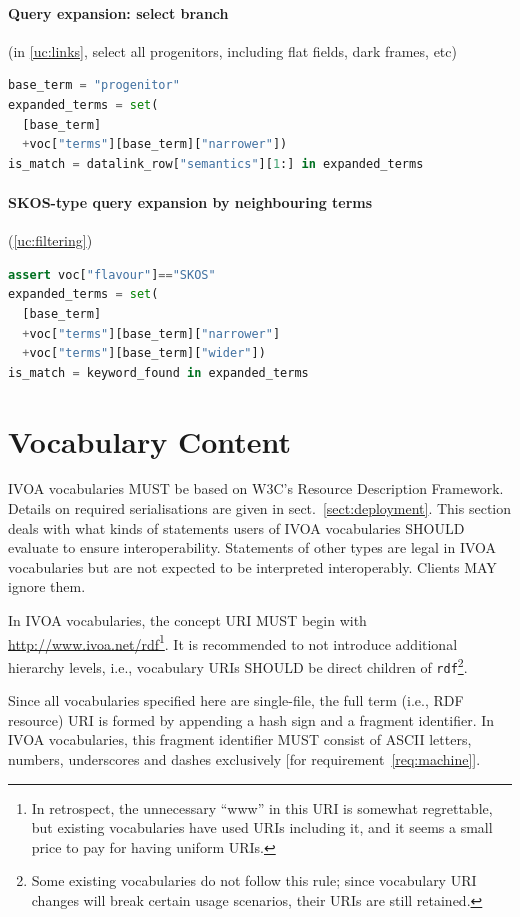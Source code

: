 \documentclass[11pt,a4paper]{ivoa}
\begin{document}
\paragraph{Query expansion: select branch} (in \ref{uc:links}, select all
progenitors, including flat fields, dark frames, etc)
\begin{lstlisting}[language=python]
base_term = "progenitor"
expanded_terms = set(
  [base_term]
  +voc["terms"][base_term]["narrower"])
is_match = datalink_row["semantics"][1:] in expanded_terms
\end{lstlisting}

\paragraph{SKOS-type query expansion by neighbouring terms}
(\ref{uc:filtering})
\begin{lstlisting}[language=python]
assert voc["flavour"]=="SKOS"
expanded_terms = set(
  [base_term]
  +voc["terms"][base_term]["narrower"]
  +voc["terms"][base_term]["wider"])
is_match = keyword_found in expanded_terms
\end{lstlisting}


\section{Vocabulary Content}
\label{sect:voccontent}

IVOA vocabularies MUST be based on W3C's Resource Description Framework.
Details on required serialisations are given in
sect.~\ref{sect:deployment}.  This section deals with what kinds of
statements users of IVOA vocabularies SHOULD evaluate to ensure
interoperability.   Statements of other types are legal in IVOA
vocabularies but are not expected to be interpreted interoperably.
Clients MAY ignore them.

In IVOA vocabularies, the concept URI MUST begin with
\url{http://www.ivoa.net/rdf}\footnote{In retrospect, the unnecessary
``www'' in this URI is somewhat regrettable, but existing vocabularies
have used URIs including it, and it seems a small price to pay for
having uniform URIs.}.  It is recommended to not introduce
additional hierarchy levels, i.e., vocabulary URIs SHOULD be direct children
of \texttt{rdf}\footnote{Some existing vocabularies do not follow this
rule; since vocabulary URI changes will break certain usage scenarios,
their URIs are still retained.}.

Since all vocabularies specified here are
single-file, the full term (i.e., RDF resource) 
URI is formed by appending a hash sign
and a fragment identifier.  In IVOA vocabularies, this fragment
identifier MUST consist of ASCII letters, numbers, underscores and
dashes exclusively [for requirement~\ref{req:machine}].
\end{document}
